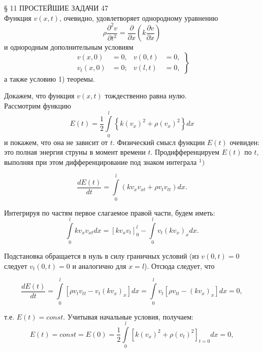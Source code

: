 \documentclass{article}
\begin{document}
\pagestyle{empty}

\noindent § 11 \hfill ПРОСТЕЙШИЕ ЗАДАЧИ \hfill 47 \\

\noindent Функция $v(x, t)$, очевидно, удовлетворяет однородному уравнению
\begin{equation}
\rho \frac{\partial^2 v}{\partial t^2} = \frac{\partial}{\partial x}\left(k\frac{\partial v}{\partial x}\right)
\tag{77}
\end{equation}
и однородным дополнительным условиям
\begin{equation}
\left.
\begin{aligned}
v(x, 0) &= 0, & v(0, t) &= 0, \\
v_t(x, 0) &= 0; & v(l, t) &= 0,
\end{aligned}
\right\}
\tag{78}
\end{equation}
\noindent а также условию 1) теоремы.

\noindent Докажем, что функция $v(x, t)$ тождественно равна нулю. \\ Рассмотрим функцию
\begin{equation}
E(t) = \frac{1}{2} \int\limits_0^l\left\{k (v_x)^2 + \rho (v_x)^2\right\} dx 
\tag{79}
\end{equation}
и покажем, что она не зависит от $t$. Физический смысл функции $E(t)$ очевиден: это полная энергия струны в момент времени $t$. Продифференцируем $E(t)$ по $t$, выполняя при этом дифференцирование под знаком интеграла $^1)$


\[ \frac{dE(t)}{dt} = \int\limits_0^l \left( k v_x v_{xt} + \rho v_t v_{tt} \right) dx. \]


\noindent Интегрируя по частям первое слагаемое правой части, будем иметь:
\begin{equation}
\int\limits_0^l k v_x v_{xt} dx = \left[ k v_x v_t \right]_0^l - \int\limits_0^l v_t (k v_x)_x dx. \tag{80}
\end{equation}

\noindent Подстановка обращается в нуль в силу граничных условий (из $v(0, t) = 0$ следует $v_t(0, t) = 0$ и аналогично для $x = l$). Отсюда следует, что


\[ \frac{dE(t)}{dt} = \int\limits_0^l \left[ \rho v_t v_{tt} - v_t (k v_x)_x \right] dx = \int\limits_0^l v_t \left[ \rho v_{tt} - (k v_x)_x \right] dx = 0, \]

\noindent т.е. $E(t) = const$. Учитывая начальные условия, получаем:
\begin{equation}
E(t) = const = E(0) = \frac{1}{2} \int\limits_0^l \left[ k(v_x)^2 + \rho(v_t)^2 \right]_{t=0} dx = 0,
\tag{81}
\end{equation}
\end{document}
